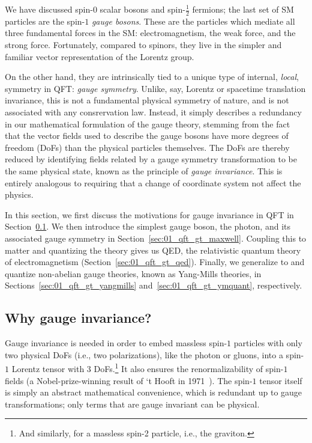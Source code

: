 We have discussed spin-$0$ scalar bosons and spin-$\frac{1}{2}$ fermions; the last set of SM particles are the spin-$1$ \textit{gauge bosons}.
These are the particles which mediate all three fundamental forces in the SM: electromagnetism, the weak force, and the strong force.
Fortunately, compared to spinors, they live in the simpler and familiar vector representation of the Lorentz group.

On the other hand, they are intrinsically tied to a unique type of internal, \textit{local}, symmetry in QFT: \textit{gauge symmetry}.
Unlike, say, Lorentz or spacetime translation invariance, this is not a fundamental physical symmetry of nature, and is not associated with any consrervation law.
Instead, it simply describes a redundancy in our mathematical formulation of the gauge theory, stemming from the fact that the vector fields used to describe the gauge bosons have more degrees of freedom (DoFs) than the physical particles themselves.
The DoFs are thereby reduced by identifying fields related by a gauge symmetry transformation to be the same physical state, known as the principle of \textit{gauge invariance}.
This is entirely analogous to requiring that a change of coordinate system not affect the physics.

In this section, we first discuss the motivations for gauge invariance in QFT in Section~\ref{sec:01_qft_gt_why}.
We then introduce the simplest gauge boson, the photon, and its associated \UU[1] gauge symmetry in Section~\ref{sec:01_qft_gt_maxwell}.
Coupling this to matter and quantizing the theory gives us QED, the relativistic quantum theory of electromagnetism (Section~\ref{sec:01_qft_gt_qed}).
Finally, we generalize to and quantize non-abelian gauge theories, known as Yang-Mills theories, in Sections~\ref{sec:01_qft_gt_yangmills} and~\ref{sec:01_qft_gt_ymquant}, respectively.


 \subsection{Why gauge invariance?}
 \label{sec:01_qft_gt_why}

Gauge invariance is needed in order to embed massless spin-$1$ particles with only two physical DoFs (i.e., two polarizations), like the photon or gluons, into a spin-$1$ Lorentz tensor with 3 DoFs.\footnote{And similarly, for a massless spin-2 particle, i.e., the graviton.}
It also ensures the renormalizability of spin-$1$ fields (a Nobel-prize-winning result of `t Hooft in 1971~\cite{tHooft:1971akt, tHooft:1971qjg}).
The spin-$1$ tensor itself is simply an abstract mathematical convenience, which is redundant up to gauge transformations; only terms that are gauge invariant can be physical.

